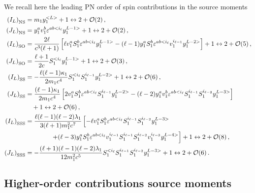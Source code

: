 \documentclass[
superscriptaddress,
preprint,
prd,tightenlines,showpacs,nofootinbib,
eqsecnum,
amsfonts,amsmath,amssymb]{revtex4-1}
\newcommand{\calO}{\mathcal{O}}
\newcommand{\exch}{1\leftrightarrow 2}
\newcommand{\nn}{\nonumber}
\begin{document}
We recall here the leading PN order of spin contributions in the source moments~\cite{Marsat14}
\begin{subequations}\label{eq:ILJLLO}
\begin{align}
	\left(I_L\right)_{\rm NS} &= m_{1}y_{1}^{<L>} + \exch + \calO(2) \,, \\
	\left(J_L\right)_{\rm NS} &= y_{1}^{a}v_{1}^{b}\varepsilon^{ab<i_\ell} y_{1}^{L-1>} + \exch + \calO(2) \,, \\
	\left(I_L\right)_{\rm SO} &= \frac{2\ell}{c^{3}(\ell+1)} \left[ \ell v_{1}^{a}S_{1}^{b}\varepsilon^{ab<i_\ell} y_{1}^{L-1>} - (\ell-1)y_{1}^{a}S_{1}^{b}\varepsilon^{ab<i_\ell} v_{1}^{i_{\ell-1}}y_{1}^{L-2>} \right] + \exch + \calO(5) \,, \\
	\left(J_L\right)_{\rm SO} &= \frac{\ell+1}{2 c} S_{1}^{<i_{\ell}}y_{1}^{L-1>} + \exch + \calO(3) \,, \\
	\left(I_L\right)_{\rm SS} &= -\frac{\ell(\ell-1)\kappa_{1}}{2 m_{1}c^{4}}  S_{1}^{<i_{\ell}}S_{1}^{i_{\ell-1}}y_{1}^{L-2>} + \exch + \calO(6) \,, \\
	\left(J_L\right)_{\rm SS} &= \frac{(\ell-1)\kappa_{1}}{2 m_{1}c^{4}} \left[ 2 v_{1}^{a}S_{1}^{b}\varepsilon^{ab<i_\ell} S_{1}^{i_{\ell-1}}y_{1}^{L-2>} - (\ell-2)y_{1}^{a}v_{1}^{b}\varepsilon^{ab<i_\ell} S_{1}^{i_{\ell-1}}S_{1}^{i_{\ell-2}}y_{1}^{L-3>} \right] \nn\\ &\quad+ \exch + \calO(6) \,, \\
	\left(I_L\right)_{\rm SSS} &= \frac{\ell(\ell-1)(\ell-2)\lambda_{1}}{3(\ell+1) m_{1}^{2}c^{7}} \left[ -\ell v_{1}^{a}S_{1}^{b}\varepsilon^{ab<i_\ell} S_{1}^{i_{\ell-1}} S_{1}^{i_{\ell-2}} y_{1}^{L-3>} \right. \nn\\ 
	&\qquad \qquad \left.+ (\ell-3)y_{1}^{a}S_{1}^{b}\varepsilon^{ab<i_\ell} v_{1}^{i_{\ell-1}} S_{1}^{i_{\ell-1}} S_{1}^{i_{\ell-2}} v_{1}^{i_{\ell-3}}y_{1}^{L-4>}  \right] + \exch + \calO(8) \,, \label{eq:ILSSS}\\
	\left(J_L\right)_{\rm SSS} &= -\frac{(\ell+1)(\ell-1)(\ell-2)\lambda_{1}}{12 m_{1}^{2}c^{5}} S_{1}^{<i_{\ell}} S_{1}^{i_{\ell-1}} S_{1}^{i_{\ell-2}} y_{1}^{L-3>} + \exch + \calO(6) \,.
\end{align}\end{subequations}


\subsection{Higher-order contributions source moments}
\label{subsec:higherordersource}
\end{document}
